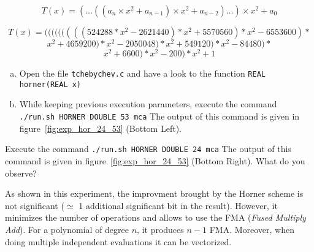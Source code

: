 \[
	T(x) = (\dots((a_n\times x^2 + a_{n-1})\times x^2 + a_{n-2})\dots) \times x^2
    + a_0
\]

$$T(x) = (((((((((524288*x^2-2621440)*x^2+5570560)*x^2-6553600)*$$
$$x^2+4659200)*x^2-2050048)*x^2+549120)*x^2-84480)*$$
$$x^2+6600)*x^2-200)*x^2+1$$

\begin{question}
  \begin{enumerate}[(a)]
  \item Open the file {\tt tchebychev.c} and have a look to the function {\tt REAL horner(REAL x)}
\item While keeping previous execution parameters, execute the command {\tt ./run.sh HORNER DOUBLE 53 mca}  \newline The output of this command is given in figure~\ref{fig:exp_hor_24_53} (Bottom Left).
  \end{enumerate}
\end{question}

\begin{question}
\item Execute the command {\tt ./run.sh HORNER DOUBLE 24 mca}  \newline
The output of this command is given in figure~\ref{fig:exp_hor_24_53} (Bottom Right).
What do you observe?
\end{question}

As shown in this experiment, the improvment brought by the Horner scheme is not significant ($\simeq$ 1 additional significant bit in the result). 
 However, it minimizes the
number of operations and allows to use the FMA ({\it Fused Multiply Add}). For
a polynomial of degree $n$, it produces $n-1$ FMA. Moreover, when doing
multiple independent evaluations it can be vectorized.

